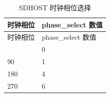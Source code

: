 \begin{longtable}[c]{ |p{2cm}|p{3cm}| }
\caption{SDHOST 时钟相位选择} \label{tab:sdhost-clk-sel}\\
\hline
\rowcolor{lightgray}
时钟相位 & phase\_select 数值 \\
\hline
\endfirsthead
\hline
\rowcolor{lightgray}
时钟相位 & phase\_select 数值  \\
\hline
\endhead
\endfoot
0 & 0 \\\hline
90 & 1 \\\hline
180 & 4 \\\hline
270 & 6 \\\hline
\end{longtable}
